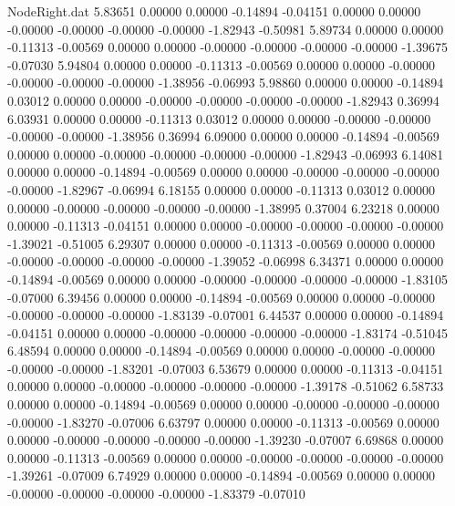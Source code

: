 \begin{filecontents}{NodeRight.dat}
   5.83651    0.00000    0.00000    -0.14894   -0.04151    0.00000    0.00000   -0.00000   -0.00000   -0.00000   -0.00000   -1.82943   -0.50981
   5.89734    0.00000    0.00000    -0.11313   -0.00569    0.00000    0.00000   -0.00000   -0.00000   -0.00000   -0.00000   -1.39675   -0.07030
   5.94804    0.00000    0.00000    -0.11313   -0.00569    0.00000    0.00000   -0.00000   -0.00000   -0.00000   -0.00000   -1.38956   -0.06993
   5.98860    0.00000    0.00000    -0.14894    0.03012    0.00000    0.00000   -0.00000   -0.00000   -0.00000   -0.00000   -1.82943    0.36994
   6.03931    0.00000    0.00000    -0.11313    0.03012    0.00000    0.00000   -0.00000   -0.00000   -0.00000   -0.00000   -1.38956    0.36994
   6.09000    0.00000    0.00000    -0.14894   -0.00569    0.00000    0.00000   -0.00000   -0.00000   -0.00000   -0.00000   -1.82943   -0.06993
   6.14081    0.00000    0.00000    -0.14894   -0.00569    0.00000    0.00000   -0.00000   -0.00000   -0.00000   -0.00000   -1.82967   -0.06994
   6.18155    0.00000    0.00000    -0.11313    0.03012    0.00000    0.00000   -0.00000   -0.00000   -0.00000   -0.00000   -1.38995    0.37004
   6.23218    0.00000    0.00000    -0.11313   -0.04151    0.00000    0.00000   -0.00000   -0.00000   -0.00000   -0.00000   -1.39021   -0.51005
   6.29307    0.00000    0.00000    -0.11313   -0.00569    0.00000    0.00000   -0.00000   -0.00000   -0.00000   -0.00000   -1.39052   -0.06998
   6.34371    0.00000    0.00000    -0.14894   -0.00569    0.00000    0.00000   -0.00000   -0.00000   -0.00000   -0.00000   -1.83105   -0.07000
   6.39456    0.00000    0.00000    -0.14894   -0.00569    0.00000    0.00000   -0.00000   -0.00000   -0.00000   -0.00000   -1.83139   -0.07001
   6.44537    0.00000    0.00000    -0.14894   -0.04151    0.00000    0.00000   -0.00000   -0.00000   -0.00000   -0.00000   -1.83174   -0.51045
   6.48594    0.00000    0.00000    -0.14894   -0.00569    0.00000    0.00000   -0.00000   -0.00000   -0.00000   -0.00000   -1.83201   -0.07003
   6.53679    0.00000    0.00000    -0.11313   -0.04151    0.00000    0.00000   -0.00000   -0.00000   -0.00000   -0.00000   -1.39178   -0.51062
   6.58733    0.00000    0.00000    -0.14894   -0.00569    0.00000    0.00000   -0.00000   -0.00000   -0.00000   -0.00000   -1.83270   -0.07006
   6.63797    0.00000    0.00000    -0.11313   -0.00569    0.00000    0.00000   -0.00000   -0.00000   -0.00000   -0.00000   -1.39230   -0.07007
   6.69868    0.00000    0.00000    -0.11313   -0.00569    0.00000    0.00000   -0.00000   -0.00000   -0.00000   -0.00000   -1.39261   -0.07009
   6.74929    0.00000    0.00000    -0.14894   -0.00569    0.00000    0.00000   -0.00000   -0.00000   -0.00000   -0.00000   -1.83379   -0.07010

\end{filecontents}
